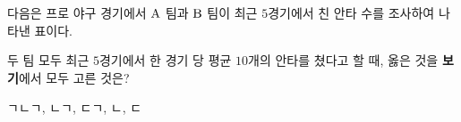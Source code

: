 다음은 프로 야구 경기에서 $\mathrm{A}$ 팀과 $\mathrm{B}$ 팀이 최근 $5$경기에서 친 안타 수를 조사하여 나타낸 표이다.\par\smallskip{\centering\par}\smallskip\noindent 두 팀 모두 최근 $5$경기에서 한 경기 당 평균 $10$개의 안타를 쳤다고 할 때, 옳은 것을 \textbf{보기}에서 모두 고른 것은? 
\begin{choices32}{ㄱ}{ㄴ}{ㄱ, ㄴ}{ㄱ, ㄷ}{ㄱ, ㄴ, ㄷ}\end{choices32}
